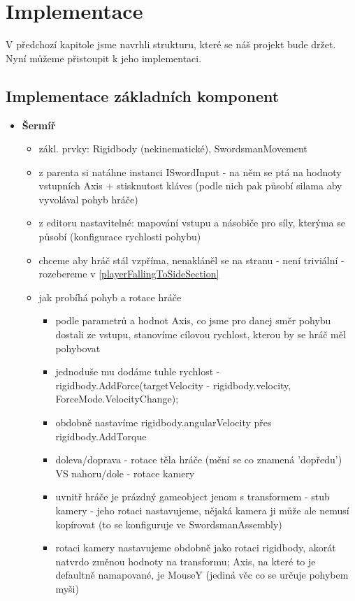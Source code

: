 \chapter{Implementace}

V předchozí kapitole jsme navrhli strukturu, které se náš projekt bude držet. Nyní můžeme přistoupit k jeho implementaci.

\section{Implementace základních komponent}
\begin{itemize}
  \item \textbf{Šermíř}
    \begin{itemize}
      \item zákl. prvky: Rigidbody (nekinematické), SwordsmanMovement
      \item z parenta si natáhne instanci ISwordInput - na něm se ptá na hodnoty vstupních Axis + stisknutost kláves (podle nich pak působí silama aby vyvolával pohyb hráče)
      \item z editoru nastavitelné: mapování vstupu a násobiče pro síly, kterýma se působí (konfigurace rychlosti pohybu)
      \item chceme aby hráč stál vzpříma, nenakláněl se na stranu - není triviální - rozebereme v \ref{playerFallingToSideSection}
      \item jak probíhá pohyb a rotace hráče
        \begin{itemize}
          \item podle parametrů a hodnot Axis, co jsme pro danej směr pohybu dostali ze vstupu, stanovíme cílovou rychlost, kterou by se hráč měl pohybovat
          \item jednoduše mu dodáme tuhle rychlost - rigidbody.AddForce(targetVelocity - rigidbody.velocity, ForceMode.VelocityChange); 
          \item obdobně nastavíme rigidbody.angularVelocity přes rigidbody.AddTorque
          \item doleva/doprava - rotace těla hráče (mění se co znamená 'dopředu') VS nahoru/dole - rotace kamery
          \item uvnitř hráče je prázdný gameobject jenom s transformem - stub kamery - jeho rotaci nastavujeme, nějaká kamera ji může ale nemusí kopírovat (to se konfiguruje ve SwordsmanAssembly)
          \item rotaci kamery nastavujeme obdobně jako rotaci rigidbody, akorát natvrdo změnou hodnoty na transformu; Axis, na které to je defaultně namapované, je MouseY (jediná věc co se určuje pohybem myši)

\end{itemize}
\end{itemize}
\end{itemize}
